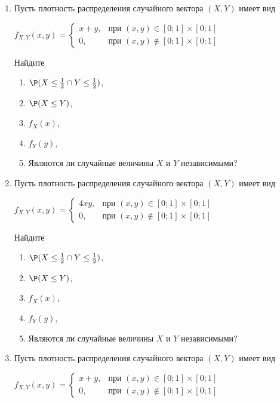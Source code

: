 \begin{enumerate}
\item Пусть плотность распределения случайного вектора $(X,Y)$ имеет вид
\begin{center} $f_{X,Y}(x,y) = \begin{cases} x+y, & \text{при } (x,y) \in [0;1] \times [0;1] \\ 0 , & \text{при } (x,y) \not\in [0;1] \times [0;1] \end{cases}$  \end{center}

Найдите
\begin{enumerate}
\item $\P(X \leq \frac{1}{2} \cap Y \leq \frac{1}{2})$,
\item $\P(X\leq Y)$,
\item $f_{X}(x)$,
\item $f_{Y}(y)$,
\item Являются ли случайные величины $X$ и $Y$ независимыми?
\end{enumerate}

\item Пусть плотность распределения случайного вектора $(X,Y)$ имеет вид
\begin{center} $f_{X,Y}(x,y) = \begin{cases} 4xy, & \text{при } (x,y) \in [0;1] \times [0;1] \\ 0 , & \text{при } (x,y) \not\in [0;1] \times [0;1] \end{cases}$  \end{center}

Найдите
\begin{enumerate}
\item $\P(X \leq \frac{1}{2} \cap Y \leq \frac{1}{2})$,
\item $\P(X\leq Y)$,
\item $f_{X}(x)$,
\item $f_{Y}(y)$,
\item Являются ли случайные величины $X$ и $Y$ независимыми?
\end{enumerate}

\item Пусть плотность распределения случайного вектора $(X,Y)$ имеет вид
\begin{center} $f_{X,Y}(x,y) = \begin{cases} x+y, & \text{при } (x,y) \in [0;1] \times [0;1] \\ 0 , & \text{при } (x,y) \not\in [0;1] \times [0;1] \end{cases}$  \end{center}


\end{enumerate}
